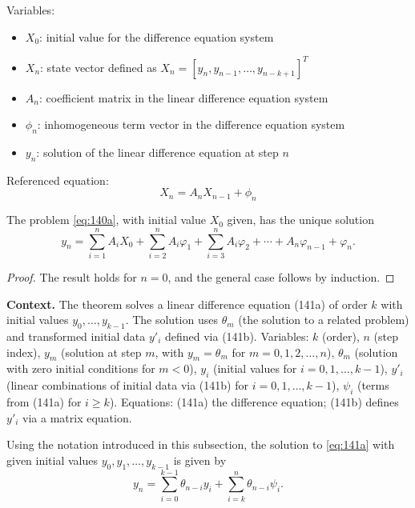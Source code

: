 Variables:
\begin{itemize}
    \item $X_0$: initial value for the difference equation system
    \item $X_n$: state vector defined as $X_n = [y_n, y_{n-1}, \dots, y_{n-k+1}]^T$
    \item $A_n$: coefficient matrix in the linear difference equation system
    \item $\phi_n$: inhomogeneous term vector in the difference equation system
    \item $y_n$: solution of the linear difference equation at step $n$
\end{itemize}

Referenced equation:
\begin{equation}
X_n = A_n X_{n-1} + \phi_n \tag{140a}
\end{equation}

\begin{theorem}

  \label{thm:140A}
The problem \eqref{eq:140a}, with initial value $X_0$ given, has the unique solution
\[
y_n = \sum_{i=1}^{n} A_i X_0 + \sum_{i=2}^{n} A_i \varphi_1 + \sum_{i=3}^{n} A_i \varphi_2 + \cdots + A_n \varphi_{n-1} + \varphi_n.
\]
\end{theorem}

\begin{proof}
The result holds for $n = 0$, and the general case follows by induction.
\end{proof}

\noindent\textbf{Context.}
The theorem solves a linear difference equation (141a) of order $k$ with initial values $y_0,\dots,y_{k-1}$. The solution uses $\theta_m$ (the solution to a related problem) and transformed initial data $y'_i$ defined via (141b). Variables: $k$ (order), $n$ (step index), $y_m$ (solution at step $m$, with $y_m=\theta_m$ for $m=0,1,2,\dots,n$), $\theta_m$ (solution with zero initial conditions for $m<0$), $y_i$ (initial values for $i=0,1,\dots,k-1$), $y'_i$ (linear combinations of initial data via (141b) for $i=0,1,\dots,k-1$), $\psi_i$ (terms from (141a) for $i\ge k$). Equations: (141a) the difference equation; (141b) defines $y'_i$ via a matrix equation.

\begin{theorem}

  \label{thm:141A}
Using the notation introduced in this subsection, the solution to \eqref{eq:141a} with given initial values $y_0, y_1, \dots, y_{k-1}$ is given by
\[
y_n = \sum_{i=0}^{k-1} \theta_{n-i} y_i + \sum_{i=k}^{n} \theta_{n-i} \psi_i. \tag{141c}
\]
\end{theorem}

